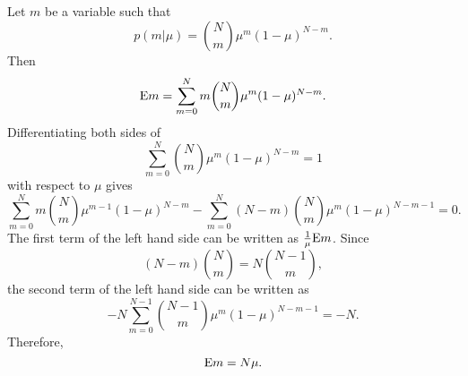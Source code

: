 \subsection{}
\label{2.4}
Let $m$ be a variable such that
%
\begin{equation}
p(m | \mu) = {N \choose m} \mu ^ m (1 - \mu) ^ {N - m}.
\end{equation}
%
Then
%
\begin{equation}
{\rm E} m = \sum_{m = 0}^{N} m {N \choose m} \mu ^ m (1 - \mu) ^ {N - m}.
\end{equation}
%
Differentiating both sides of 
%
\begin{equation}
\sum_{m = 0}^{N} {N \choose m} \mu ^ m (1 - \mu) ^ {N - m}  = 1
\end{equation}
%
with respect to $\mu$ gives
%
\begin{equation}
\sum_{m = 0}^{N} m {N \choose m} \mu ^ {m - 1} (1 - \mu) ^ {N - m} - \sum_{m = 0}^{N} (N - m) {N \choose m} \mu ^ m (1 - \mu) ^ {N - m - 1} = 0.
\end{equation}
%
The first term of the left hand side can be written as $\frac{1}{\mu} {\rm E} m$.
Since
%
\begin{equation}
(N - m) {N \choose m} = N {N - 1 \choose m},
\end{equation}
%
the second term of the left hand side can be written as
%
\begin{equation}
- N \sum_{m = 0}^{N - 1} {N - 1 \choose m} \mu ^ m (1 - \mu) ^ {N - m - 1} = - N.
\end{equation}
%
Therefore,
%
\begin{equation}
{\rm E} m = N \mu. 
\end{equation}
%


